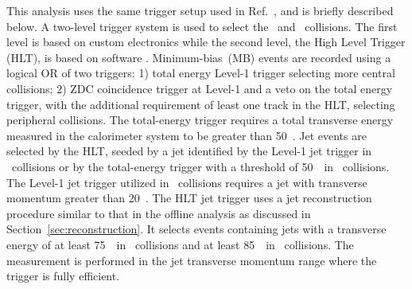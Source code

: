 This analysis uses the same trigger setup used in Ref.~\cite{Aaboud:2018hpb}, and is briefly described below.
A two-level trigger system is used to select the \PbPb\ and \pp\ collisions.
The first level is based on custom electronics while the second level, the High Level Trigger (HLT), is based on software \cite{Aaboud:2016leb}.
Minimum-bias~(MB) events are recorded using a logical OR of two triggers: 1) total energy Level-1 trigger selecting more central collisions; 2) ZDC coincidence trigger at Level-1 and a veto on the total energy trigger, with the additional requirement of least one track in the HLT, selecting peripheral collisions.
The total-energy trigger requires a total transverse energy measured in the calorimeter system to be greater than 50~\GeV.
Jet events are selected by the HLT, seeded by a jet identified by the Level-1 jet trigger in \pp\ collisions or by the total-energy trigger with a threshold of 50~\GeV\ in \PbPb\ collisions.
The Level-1 jet trigger utilized in \pp\ collisions requires a jet with transverse momentum greater than 20~\GeV.
The HLT jet trigger uses a jet reconstruction procedure similar to that in the offline analysis as discussed in Section~\ref{sec:reconstruction}.
It selects events containing jets with a transverse energy of at least 75~\GeV\ in \PbPb\ collisions and at least 85~\GeV\ in \pp\ collisions.
The measurement is performed in the jet transverse momentum range where the trigger is fully efficient.




